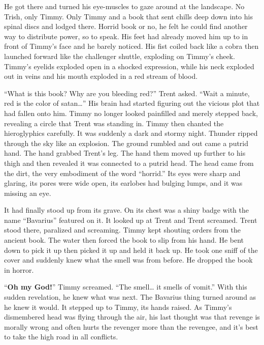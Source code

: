 He got there and turned his eye-muscles to gaze around at the
landscape. No Trish, only Timmy. Only Timmy and a book that sent
chills deep down into his spinal discs and lodged there. Horrid
book or no, he felt he could find another way to distribute power,
so to speak. His feet had already moved him up to in front of
Timmy's face and he barely noticed. His fist coiled back like a
cobra then launched forward like the challenger shuttle, exploding
on Timmy's cheek. Timmy's eyelids exploded open in a shocked
expression, while his neck exploded out in veins and his mouth
exploded in a red stream of blood.



``What is this book? Why are you bleeding red?'' Trent asked. ``Wait a
minute, red is the color of satan{\ldots}'' His brain had started
figuring out the vicious plot that had fallen onto him. Timmy no
longer looked painfilled and merely stepped back, revealing a
circle that Trent was standing in. Timmy then chanted the
hieroglyphics carefully. It was suddenly a dark and stormy night.
Thunder ripped through the sky like an explosion. The ground
rumbled and out came a putrid hand. The hand grabbed Trent's leg.
The hand them moved up further to his thigh and then revealed it
was connected to a putrid head. The head came from the dirt, the
very embodiment of the word ``horrid.'' Its eyes were sharp and
glaring, its pores were wide open, its earlobes had bulging lumps,
and it was missing an eye.



It had finally stood up from its grave. On its chest was a shiny
badge with the name ``Bavarius'' featured on it. It looked up at
Trent and Trent screamed. Trent stood there, paralized and
screaming. Timmy kept shouting orders from the ancient book. The
water then forced the book to slip from his hand. He bent down to
pick it up then picked it up and held it back up. He took one sniff
of the cover and suddenly knew what the smell was from before. He
dropped the book in horror.



``{\bf Oh my God!}'' Timmy screamed. ``The smell{\ldots} it smells of
vomit.''  With this sudden revelation, he knew what was next. The
Bavarius thing turned around as he knew it would. It stepped up to
Timmy, its hands raised. As Timmy's dismembered head was flying through
the air, his last thought was that revenge is morally wrong and often
hurts the revenger more than the revengee, and it's best to take the
high road in all conflicts.

 






